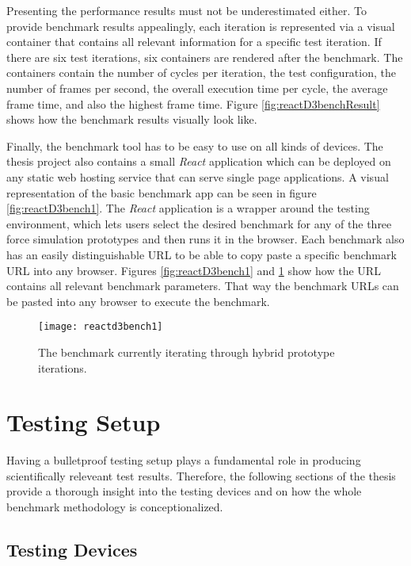 Presenting the performance results must not be underestimated either. To provide benchmark results appealingly, each iteration is represented via a visual container that contains all relevant information for a specific test iteration. If there are six test iterations, six containers are rendered after the benchmark. The containers contain the number of cycles per iteration, the test configuration, the number of frames per second, the overall execution time per cycle, the average frame time, and also the highest frame time. Figure \ref{fig:reactD3benchResult} shows how the benchmark results visually look like.

Finally, the benchmark tool has to be easy to use on all kinds of devices. The thesis project also contains a small \emph{React} application which can be deployed on any static web hosting service that can serve single page applications. A visual representation of the basic benchmark app can be seen in figure \ref{fig:reactD3bench1}. The \emph{React} application is a wrapper around the testing environment, which lets users select the desired benchmark for any of the three force simulation prototypes and then runs it in the browser. Each benchmark also has an easily distinguishable URL to be able to copy paste a specific benchmark URL into any browser. Figures \ref{fig:reactD3bench1} and \ref{fig:reactD3bench2} show how the URL contains all relevant benchmark parameters. That way the benchmark URLs can be pasted into any browser to execute the benchmark. 

\begin{figure}
  \centering
  \texttt{[image: reactd3bench1]}
  \caption{The benchmark currently iterating through hybrid prototype iterations.}
  \label{fig:reactD3bench2}
\end{figure}

\section{Testing Setup}

Having a bulletproof testing setup plays a fundamental role in producing scientifically releveant test results. Therefore, the following sections of the thesis provide a thorough insight into the testing devices and on how the whole benchmark methodology is conceptionalized. 

\subsection{Testing Devices}

